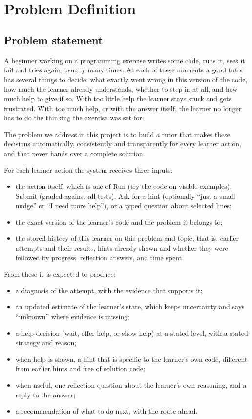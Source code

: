 \chapter{Problem Definition}
\section{Problem statement}
A beginner working on a programming exercise writes some code, runs it, sees it fail and tries again, usually many times. At each of these moments a good tutor has several things to decide: what exactly went wrong in this version of the code, how much the learner already understands, whether to step in at all, and how much help to give if so. With too little help the learner stays stuck and gets frustrated. With too much help, or with the answer itself, the learner no longer has to do the thinking the exercise was set for.

The problem we address in this project is to build a tutor that makes these decisions automatically, consistently and transparently for every learner action, and that never hands over a complete solution.

For each learner action the system receives three inputs:
\begin{itemize}
\item the action itself, which is one of Run (try the code on visible examples), Submit (graded against all tests), Ask for a hint (optionally ``just a small nudge'' or ``I need more help''), or a typed question about selected lines;
\item the exact version of the learner's code and the problem it belongs to;
\item the stored history of this learner on this problem and topic, that is, earlier attempts and their results, hints already shown and whether they were followed by progress, reflection answers, and time spent.
\end{itemize}

From these it is expected to produce:
\begin{itemize}
\item a diagnosis of the attempt, with the evidence that supports it;
\item an updated estimate of the learner's state, which keeps uncertainty and says ``unknown'' where evidence is missing;
\item a help decision (wait, offer help, or show help) at a stated level, with a stated strategy and reason;
\item when help is shown, a hint that is specific to the learner's own code, different from earlier hints and free of solution code;
\item when useful, one reflection question about the learner's own reasoning, and a reply to the answer;
\item a recommendation of what to do next, with the route ahead.
\end{itemize}

